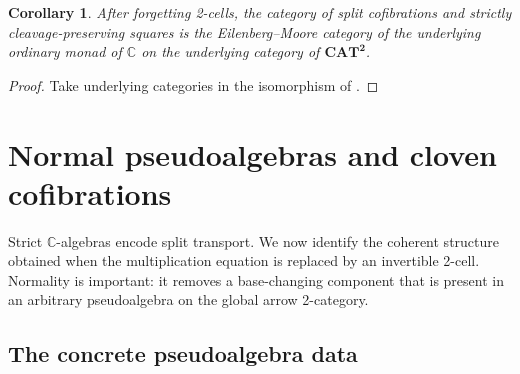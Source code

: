 \documentclass[11pt]{article}
\theoremstyle{plain}
\newtheorem{corollary}[theorem]{Corollary}
\theoremstyle{definition}
\theoremstyle{remark}
\newcommand{\CAT}{\mathbf{CAT}}
\newcommand{\C}{\mathbb{C}}
\numberwithin{equation}{section}
\begin{document}
\begin{corollary}\label{cor:ordinary-monadicity}
After forgetting 2-cells, the category of split cofibrations and
strictly cleavage-preserving squares is the Eilenberg--Moore category
of the underlying ordinary monad of $\C$ on the underlying category of
$\CAT^{\mathbf 2}$.
\end{corollary}

\begin{proof}
Take underlying categories in the isomorphism of
.
\end{proof}

\section{Normal pseudoalgebras and cloven cofibrations}
\label{sec:pseudoalgebras}

Strict $\C$-algebras encode split transport.  We now identify the
coherent structure obtained when the multiplication equation is replaced
by an invertible 2-cell.  Normality is important: it removes a
base-changing component that is present in an arbitrary pseudoalgebra on
the global arrow 2-category.

\subsection{The concrete pseudoalgebra data}
\end{document}
